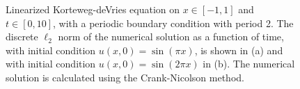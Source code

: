 \begin{figure}
\centering
{}\hspace{0mm}
\hspace{0mm}
\caption{Linearized Korteweg-deVries equation on $x \in [-1,1]$ and $t \in [0,10]$, with a periodic boundary condition with period 2. The discrete $\ell_2$ norm of the numerical solution as a function of time, with initial condition $u(x,0)=\sin{(\pi x)}$, is shown in (a) and with initial condition $u(x,0)=\sin{(2 \pi x)}$ in (b). The numerical solution is calculated using the Crank-Nicolson method.}
\end{figure}

\newpage
\ 
\newpage